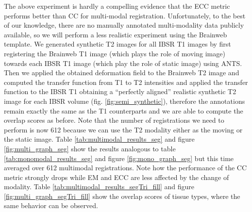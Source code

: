 The above experiment is hardly a compelling evidence that the ECC metric performs better than CC for multi-modal registration. Unfortunately, to the best of our knowledge,
there are no manually annotated multi-modality data publicly available, so we will perform a less
realistic experiment using the Brainweb template. We generated synthetic T2 images for all IBSR T1 images by first registering the Brainweb T1 image (which plays the role of
moving image) towards each IBSR T1 image (which play the role of static image) using ANTS. Then we applied the obtained deformation field to the Brainweb T2 image and computed
the transfer function from T1 to T2 intensities and applied the transfer function to the IBSR T1 obtaining a ``perfectly aligned'' realistic synthetic T2 image for each IBSR volume
(fig. \ref{fig:semi_synthetic}), therefore the annotations remain exactly the same as the T1 counterparts and we are able to compute the overlap scores as before. Note that the number
of registrations we need to perform is now 612 because we can use the T2 modality either as the moving or the static image. Table \ref{tab:multimodal_results_seg} and
figure \ref{fig:multi_graph_seg} show the results analogous to table \ref{tab:monomodal_results_seg} and figure \ref{fig:mono_graph_seg} but this time averaged over 612
multimodal registrations. Note how the performance of the CC metric strongly drops while EM and ECC are less affected by the change of modality. Table
\ref{tab:multimodal_results_segTri_fill} and figure \ref{fig:multi_graph_segTri_fill} show the overlap scores of tissue types, where the same
behavior can be observed.\\

